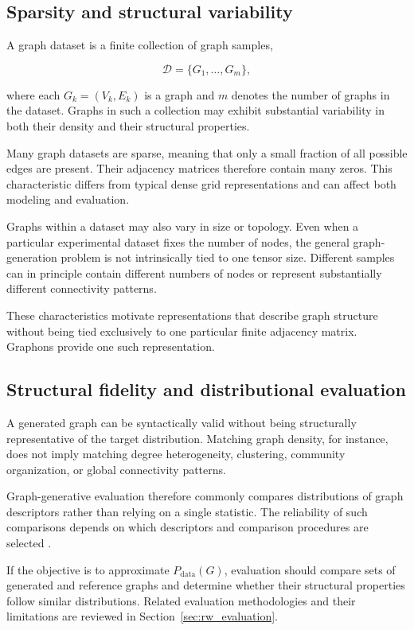 \subsection{Sparsity and structural variability}
\label{subsec:sparsity_structural_variability}

A graph dataset is a finite collection of graph samples,

\[
\mathcal{D}=\{G_1,\ldots,G_m\},
\]

where each \(G_k=(V_k,E_k)\) is a graph and \(m\) denotes the number of graphs in the dataset. Graphs in such a collection may exhibit substantial variability in both their density and their structural properties.

Many graph datasets are sparse, meaning that only a small fraction of all possible edges are present. Their adjacency matrices therefore contain many zeros. This characteristic differs from typical dense grid representations and can affect both modeling and evaluation.

Graphs within a dataset may also vary in size or topology. Even when a particular experimental dataset fixes the number of nodes, the general graph-generation problem is not intrinsically tied to one tensor size. Different samples can in principle contain different numbers of nodes or represent substantially different connectivity patterns.

These characteristics motivate representations that describe graph structure without being tied exclusively to one particular finite adjacency matrix. Graphons provide one such representation.


\subsection{Structural fidelity and distributional evaluation}
\label{subsec:structural_fidelity}

A generated graph can be syntactically valid without being structurally representative of the target distribution. Matching graph density, for instance, does not imply matching degree heterogeneity, clustering, community organization, or global connectivity patterns.

Graph-generative evaluation therefore commonly compares distributions of graph descriptors rather than relying on a single statistic. The reliability of such comparisons depends on which descriptors and comparison procedures are selected \cite{obray2022evaluation}.

If the objective is to approximate \(P_{\mathrm{data}}(G)\), evaluation should compare sets of generated and reference graphs and determine whether their structural properties follow similar distributions. Related evaluation methodologies and their limitations are reviewed in Section~\ref{sec:rw_evaluation}.


